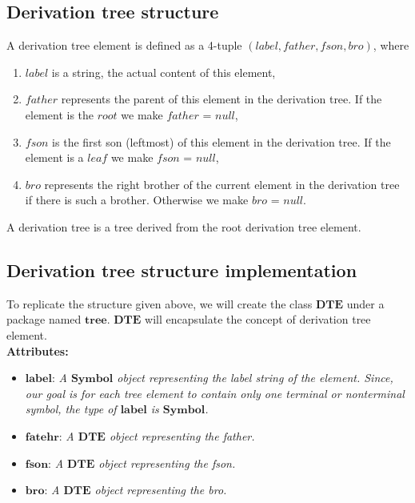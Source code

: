 \vspace{10pt}

\subsection{Derivation tree structure}

\begin{definition}[3.0]
    A derivation tree element is defined as a 4-tuple \((label, father, fson, bro)\), where
    \begin{enumerate}
        \item \(label\) is a string, the actual content of this element,
        \item \(father\) represents the parent of this element in the derivation tree. If the element is the \(root\) we make \(father\) = \(null\),
        \item \(fson\) is the first son (leftmost) of this element in the derivation tree. If the element is a \(leaf\) we make \(fson\) = \(null\),
        \item \(bro\) represents the right brother of the current element in the derivation tree if there is such a brother. Otherwise we make \(bro\) = \(null\).
    \end{enumerate}

    A derivation tree is a tree derived from the root derivation tree element.

\end{definition}
\setlength{\parindent}{0pt}

\vspace{10pt}

\subsection{Derivation tree structure implementation}

To replicate the structure given above, we will create the class \(\boldsymbol{DTE}\) under a package named \(\boldsymbol{tree}\). \(\boldsymbol{DTE}\) will encapsulate the concept of derivation tree element.\\

\textbf{Attributes:}
\begin{itemize}
    \item \(\boldsymbol{label}\): \textit{A \(\boldsymbol{Symbol}\) object representing the label string of the element. Since, our goal is for each tree element to contain only one terminal or nonterminal symbol, the type of \(\boldsymbol{label}\) is \(\boldsymbol{Symbol}\).}
    \item \(\boldsymbol{fatehr}\): \textit{A \(\boldsymbol{DTE}\) object representing the father.}
    \item \(\boldsymbol{fson}\): \textit{A \(\boldsymbol{DTE}\) object representing the fson.}
    \item \(\boldsymbol{bro}\): \textit{A \(\boldsymbol{DTE}\) object representing the bro.}
\end{itemize}

